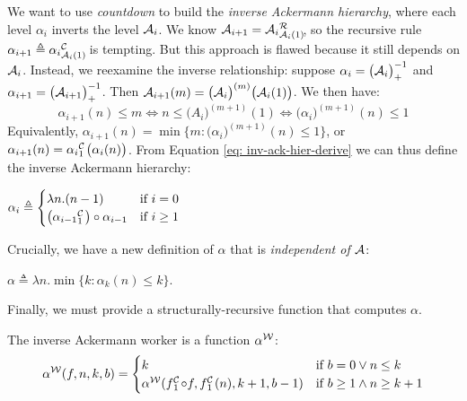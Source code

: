 We want to use \emph{countdown} to build the \emph{inverse Ackermann hierarchy}, where each
level $\alpha_i$ inverts the level $\mathcal{A}_i$.
We know $\Ack_{i+1} = \rf{\Ack_i}{\Ack_i(1)}$, so the recursive
rule $\alpha_{i+1} \triangleq \cdt{\alpha_i}{\Ack_i(1)}$ is tempting.
But this approach is flawed because it still depends on $\mathcal{A}_i$.
Instead, we reexamine the inverse relationship: suppose $\alpha_i = \big(\mathcal{A}_i\big)^{-1}_+$ and $\alpha_{i+1} = \big(\mathcal{A}_{i+1}\big)^{-1}_+$. Then $\mathcal{A}_{i+1}(m) = \big(\mathcal{A}_{i}\big)^{(m)} \big(\mathcal{A}_{i}(1)\big)$. We then have:
\begin{equation} \label{eq: inv-ack-hier-derive}
\alpha_{i+1}(n)\le m \iff n\le \big(A_i\big)^{(m+1)}(1) \iff \big(\alpha_i\big)^{(m+1)}(n) \le 1
\end{equation}
Equivalently, $\alpha_{i+1}(n) = \min\big\{m : \big( \alpha_i \big)^{(m+1)}(n)\le 1\big\}$, or $\alpha_{i+1}(n) = \cdt{\alpha_i}{1}\big(\alpha_i(n)\big)$. From Equation \ref{eq: inv-ack-hier-derive} we can thus define the inverse Ackermann hierarchy:
\begin{defn} \label{defn: inv-ack-hier}
	$ \alpha_i \triangleq \begin{cases}
	\lambda n.(n - 1) & \text{if } i = 0
	\\ \big(\cdt{\alpha_{i-1}}{1}\big)\circ \alpha_{i-1} & \text{if } i\ge 1 \end{cases}
$
\end{defn}
Crucially, we have a new definition of $\alpha$ 
that is \emph{independent of $\mathcal{A}$}:
\begin{defn} \label{defn: inv-ack-new}
	$\alpha \triangleq \lambda n. \min\big\{k : \alpha_k(n)\le k \big\}$.
\end{defn}
Finally, we must provide a structurally-recursive function that computes $\alpha$.
\begin{defn} \label{defn: inv-ack-worker}
	The inverse Ackermann worker is a function $\alpha^{\mathcal{W}}$: %
	\begin{equation} \label{eq: inv-ack-worker-recursion}
	\alpha^{\W}(f, n, k, b) = \begin{cases}
	k & \text{if } b = 0 \vee n\le k \\ \alpha^{\W}(\cdt{f}{1}\circ f , \cdt{f}{1}(n), k+1, b-1) & \text{if } b \ge 1 \wedge n \ge k+1
	\end{cases}
	\end{equation}
\end{defn}
